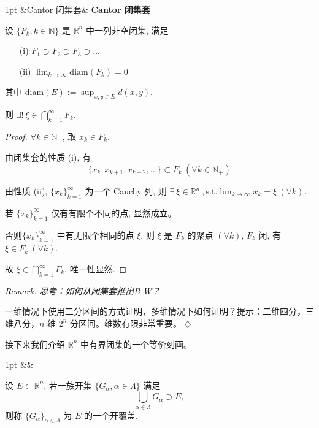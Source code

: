 \documentclass[a4paper]{article}
\newcommand{\R}{\mathbb{R}}
\newcommand{\N}{\mathbb{N}}
\newcommand{\st}{,\text{s.t.}}
\newenvironment{formal}[1][]{%
\def\FrameCommand{%
\hspace{1pt}%
{\color{formalline}\vrule width 2pt}%
{\color{formalshade}\vrule width 4pt}%
\colorbox{formalshade}%
}%
\MakeFramed{\advance\hsize-\width\FrameRestore}%
\noindent
\hspace{-4.55pt}%
\begin{adjustwidth}{}{1pt}%
\setlength{\parindent}{0pt}%
\vspace{3pt}%
\ifx&#1&\else %
\textbf{#1}\par
\vspace{1pt}%
\fi }{%
\vspace{2pt}%
\end{adjustwidth}\endMakeFramed%
}
\newenvironment{theorem}[1][]{%
\def\FrameCommand{%
\hspace{1pt}%
{\color{theoremline}\vrule width 2pt}%
{\color{theoremshade}\vrule width 4pt}%
\colorbox{theoremshade}%
}%
\MakeFramed{\advance\hsize-\width\FrameRestore}%
\noindent
\hspace{-4.55pt}%
\begin{adjustwidth}{}{1pt}%
\setlength{\parindent}{0pt}%
\vspace{3pt}%
\ifx&#1&\else %
\textbf{#1}\par
\vspace{1pt}%
\fi }{%
\vspace{2pt}%
\end{adjustwidth}\endMakeFramed%
}
\newenvironment{remark}{%
\par
\smallskip
\noindent
\itshape Remark. }{%
\smallskip
\hfill$\diamondsuit$ \par}
\begin{document}
    \begin{theorem}[Cantor 闭集套]
        设 $\{F_{k}, k \in \N\}$ 是 $\R^{n}$ 中一列非空闭集, 满足
        \begin{itemize}
            \item[(i)] $F_{1}\supset F_{2}\supset F_{3}\supset \dots$

            \item[(ii)] $\lim_{k \to \infty}\mathrm{diam}(F_{k}) = 0$
        \end{itemize}
        其中 $\mathrm{diam}(E) := \sup_{x, y \in E}d(x, y)$.

        则 $\exists! \ \xi \in \bigcap_{k=1}^{\infty}F_{k}$.
    \end{theorem}

    \begin{proof}[Proof]
        $\forall k \in \mathbb{N}_{+}$, 取 $x_{k}\in F_{k}$.

        由闭集套的性质 (i), 有
        \[
            \{x_{k}, x_{k+1}, x_{k+2}, \dots \} \subset F_{k}\ (\forall k \in \mathbb{N}
            _{+})
        \]

        由性质 (ii), $\{x_{k}\}_{k=1}^{\infty}$ 为一个 Cauchy 列, 则
        $\exists \ \xi \in \mathbb{R}^{n}\ \st \lim_{k \to \infty}x_{k}= \xi \ (\forall
        k)$.

        若 $\{x_{k}\}_{k=1}^{\infty}$ 仅有有限个不同的点, 显然成立。

        否则$\{x_{k}\}_{k=1}^{\infty}$ 中有无限个相同的点 $\xi$, 则 $\xi$ 是
        $F_{k}$ 的聚点 $(\forall k)$, $F_{k}$ 闭, 有
        $\xi \in F_{k}\ (\forall k)$.

        故 $\xi \in \bigcap_{k=1}^{\infty}F_{k}$. 唯一性显然.
    \end{proof}

    \begin{remark}
        思考：如何从闭集套推出B-W？

        一维情况下使用二分区间的方式证明，多维情况下如何证明？提示：二维四分，三维八分，$n$
        维 $2^{n}$ 分区间。维数有限非常重要。
    \end{remark}

    接下来我们介绍 $\mathbb{R}^{n}$ 中有界闭集的一个等价刻画。

    \begin{formal}
        [开覆盖] 设 $E \subset \mathbb{R}^{n}$, 若一族开集
        $\{G_{\alpha}, \alpha \in \Lambda\}$ 满足
        \[
            \bigcup_{\alpha \in \Lambda}G_{\alpha}\supset E,
        \]
        则称 $\{G_{\alpha}\}_{\alpha \in \Lambda}$ 为 $E$ 的一个开覆盖.
    \end{formal}
\end{document}
